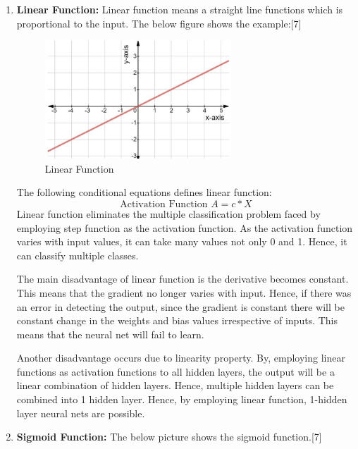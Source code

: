 \documentclass{IEEEtran}
\begin{document}
\begin{enumerate}
\item \textbf{Linear Function:} Linear function means a straight line functions which is proportional to the input. The below figure shows the example:[7]
\begin{figure}[h]
    \centering
    \captionsetup{justification=centering}
    \includegraphics[width=7cm]{lin}
    \caption{Linear Function}
    \label{fig: Linear Function}
\end{figure}
The following conditional equations defines linear function:
\begin{equation*}
\text{Activation Function  } A = c*X
\end{equation*}
Linear function eliminates the multiple classification problem faced by employing step function as the activation function. As the activation function varies with input values, it can take many values not only 0 and 1. Hence, it can classify multiple classes.

The main disadvantage of linear function is the derivative becomes constant. This means that the gradient no longer varies with input. Hence,  if there was an error in detecting the output, since the gradient is constant there will be constant change in the weights and bias values irrespective of inputs. This means that the neural net will fail to learn.

Another disadvantage occurs due to linearity property. By, employing linear functions as activation functions to all hidden layers, the output will be a linear combination of hidden layers. Hence, multiple hidden layers can be combined into 1 hidden layer. Hence,  by employing linear function, 1-hidden layer neural nets are possible.
\newline
\item \textbf{Sigmoid Function:} The below picture shows the sigmoid function.[7]
\newpage


\end{enumerate}
\end{document}
